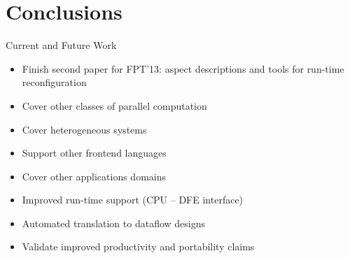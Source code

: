\section{Conclusions}

\begin{frame}{Current and Future Work}

  \begin{itemize}
  \setlength{\itemsep}{10pt}

  \item Finish second paper for FPT'13: aspect descriptions and tools
    for run-time reconfiguration

  \item Cover other classes of parallel computation

  \item Cover heterogeneous systems

  \item Support other frontend languages

  \item Cover other applications domains

  \item Improved run-time support (CPU -- DFE interface)

  \item Automated translation to dataflow designs

  \item Validate improved productivity and
    portability claims

  \end{itemize}
\end{frame}


